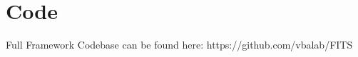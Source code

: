 \chapter{Code}

Full Framework Codebase can be found here: https://github.com/vbalab/FITS















